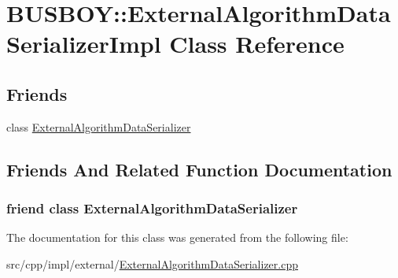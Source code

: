 \hypertarget{classBUSBOY_1_1ExternalAlgorithmDataSerializerImpl}{
\section{BUSBOY::ExternalAlgorithmDataSerializerImpl Class Reference}
\label{classBUSBOY_1_1ExternalAlgorithmDataSerializerImpl}
}
\subsection*{Friends}
\begin{DoxyCompactItemize}
\item 
class \hyperlink{classBUSBOY_1_1ExternalAlgorithmDataSerializerImpl_aceed1a5b30a2e4160afe8351a6c6bfd4}{ExternalAlgorithmDataSerializer}
\end{DoxyCompactItemize}


\subsection{Friends And Related Function Documentation}
\hypertarget{classBUSBOY_1_1ExternalAlgorithmDataSerializerImpl_aceed1a5b30a2e4160afe8351a6c6bfd4}{
\subsubsection[{ExternalAlgorithmDataSerializer}]{\setlength{\rightskip}{0pt plus 5cm}friend class {\bf ExternalAlgorithmDataSerializer}}}
\label{classBUSBOY_1_1ExternalAlgorithmDataSerializerImpl_aceed1a5b30a2e4160afe8351a6c6bfd4}


The documentation for this class was generated from the following file:\begin{DoxyCompactItemize}
\item 
src/cpp/impl/external/\hyperlink{ExternalAlgorithmDataSerializer_8cpp}{ExternalAlgorithmDataSerializer.cpp}\end{DoxyCompactItemize}

